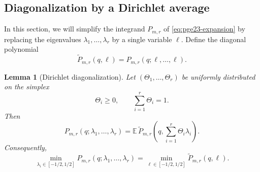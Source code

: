 ﻿\documentclass[11pt]{article}
\newtheorem{lemma}[theorem]{Lemma}
\numberwithin{equation}{section}
\newcommand{\E}{\mathbb E}
\begin{document}
\subsection{Diagonalization by a Dirichlet average}

In this section, we will simplify the integrand $P_{m,r}$ of \eqref{eq:pge23-expansion} by replacing the eigenvalues $\lambda_1,\ldots,\lambda_r$ by a single variable $\ell$.
Define the diagonal polynomial
\begin{equation}\label{eq:pge23-Ptilde}
  \widetilde P_{m,r}(q,\ell)
  =P_{m,r}(q;\ell,\ldots,\ell).
\end{equation}

\begin{lemma}[Dirichlet diagonalization]\label{lem:pge23-dirichlet}
  Let $(\Theta_1,\ldots,\Theta_r)$ be uniformly distributed on the simplex
  \[
    \Theta_i\ge0,\qquad \sum_{i=1}^r\Theta_i=1.
  \]
  Then
  \begin{equation}\label{eq:pge23-dirichlet-identity}
    P_{m,r}(q;\lambda_1,\ldots,\lambda_r)
    =\E\,\widetilde P_{m,r}
    \left(q,\sum_{i=1}^r\Theta_i\lambda_i\right).
  \end{equation}
  Consequently,
  \begin{equation}\label{eq:pge23-diagonal-min}
    \min_{\lambda_i\in[-1/2,1/2]}
    P_{m,r}(q;\lambda_1,\ldots,\lambda_r)
    =\min_{\ell\in[-1/2,1/2]}\widetilde P_{m,r}(q,\ell).
  \end{equation}
\end{lemma}
\end{document}
